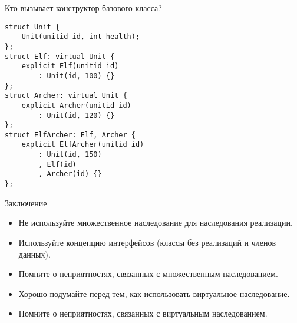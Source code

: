 \documentclass{beamer}
\begin{document}
\begin{frame}[fragile]{Кто вызывает конструктор базового класса?}
    \begin{lstlisting}
struct Unit { 
    Unit(unitid id, int health); 
};
struct Elf: virtual Unit {
    explicit Elf(unitid id) 
        : Unit(id, 100) {}
};
struct Archer: virtual Unit {
    explicit Archer(unitid id) 
        : Unit(id, 120) {}
};
struct ElfArcher: Elf, Archer {
    explicit ElfArcher(unitid id) 
        : Unit(id, 150)
        , Elf(id)
        , Archer(id) {}
};
    \end{lstlisting}
\end{frame}

\begin{frame}[fragile]{Заключение}
    \begin{itemize}
        \item Не используйте множественное наследование для наследования
            реализации.
        
        \item Используйте концепцию интерфейсов (классы без реализаций и членов данных).

        \item Помните о неприятностях, связанных с множественным наследованием.

        \item Хорошо подумайте перед тем, как использовать виртуальное
            наследование.

        \item Помните о неприятностях, связанных с виртуальным наследованием.
    \end{itemize}
\end{frame}
\end{document}
